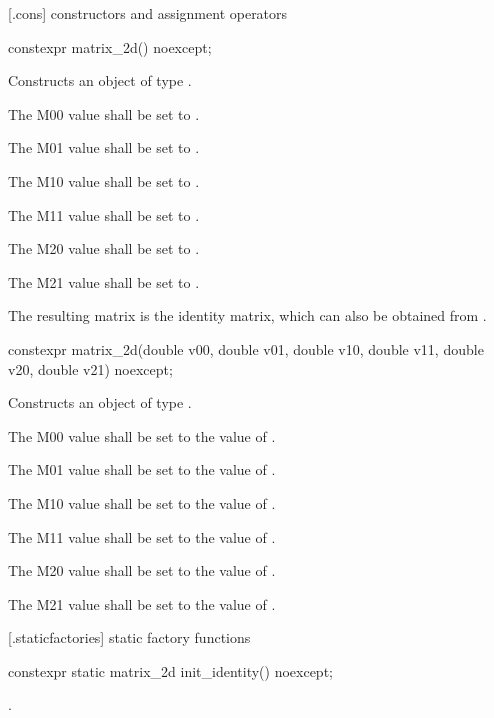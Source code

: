  [\matrixtwod.cons] { constructors and assignment operators}

\begin{itemdecl}
constexpr matrix_2d() noexcept;
\end{itemdecl}
\begin{itemdescr}
\pnum
\effects
Constructs an object of type .

\pnum
The M00 value shall be set to .

\pnum
The M01 value shall be set to .

\pnum
The M10 value shall be set to .

\pnum
The M11 value shall be set to .

\pnum
The M20 value shall be set to .

\pnum
The M21 value shall be set to .

\pnum
\realnote
The resulting matrix is the identity matrix, which can also be obtained from .
\end{itemdescr}

\begin{itemdecl}
constexpr matrix_2d(double v00, double v01, double v10, double v11,
  double v20, double v21) noexcept;
\end{itemdecl}
\begin{itemdescr}
\pnum
\effects
Constructs an object of type .

\pnum
The M00 value shall be set to the value of .

\pnum
The M01 value shall be set to the value of .

\pnum
The M10 value shall be set to the value of .

\pnum
The M11 value shall be set to the value of .

\pnum
The M20 value shall be set to the value of .

\pnum
The M21 value shall be set to the value of .
\end{itemdescr}

 [\matrixtwod.staticfactories] { static factory 
functions}

\begin{itemdecl}
constexpr static matrix_2d init_identity() noexcept;
\end{itemdecl}
\begin{itemdescr}
\pnum
\returns
{}.
\end{itemdescr}

